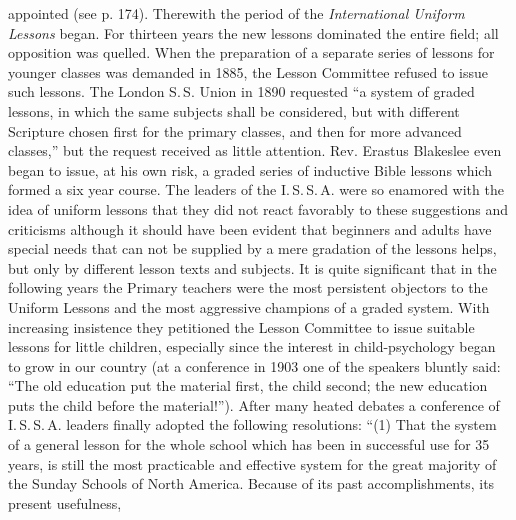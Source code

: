 appointed (see p. 174). Therewith the period of the \emph{International Uniform Lessons} began. For thirteen years the new lessons dominated the entire field; all opposition was quelled. When the preparation of a separate series of lessons for younger classes was demanded in 1885, the Lesson Committee refused to issue such lessons. The London S.\,S. Union in 1890 requested “a system of graded lessons, in which the same subjects shall be considered, but with different Scripture chosen first for the primary classes, and then for more advanced classes,” but the request received as little attention. Rev. Erastus Blakeslee even began to issue, at his own risk, a graded series of inductive Bible lessons which formed a six year course. The leaders of the I.\,S.\,S.\,A. were so enamored with the idea of uniform lessons that they did not react favorably to these suggestions and criticisms although it should have been evident that beginners and adults have special needs that can not be supplied by a mere gradation of the lessons helps, but only by different lesson texts and subjects. It is quite significant that in the following years the Primary teachers were the most persistent objectors to the Uniform Lessons and the most aggressive champions of a graded system. With increasing insistence they petitioned the Lesson Committee to issue suitable lessons for little children, especially since the interest in child-psychology began to grow in our country (at a conference in 1903 one of the speakers bluntly said: “The old education put the material first, the child second; the new education puts the child before the material!”). After many heated debates a conference of I.\,S.\,S.\,A. leaders finally adopted the following resolutions: “(1) That the system of a general lesson for the whole school which has been in successful use for 35 years, is still the most practicable and effective system for the great majority of the Sunday Schools of North America. Because of its past accomplishments, its present usefulness,
